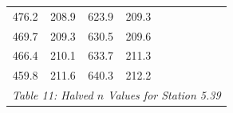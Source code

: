 \begin{center}
\begin{tabular}{|cccc||cccc||cc|}
    476.2    & 208.9                   & 623.9 & 209.3                        &          &                        &       &                              &          &                                    \\
    469.7    & 209.3                   & 630.5 & 209.6                        &          &                        &       &                              &          &                                    \\
    466.4    & 210.1                   & 633.7 & 211.3                        &          &                        &       &                              &          &                                    \\
    459.8    & 211.6                   & 640.3 & 212.2                        &          &                        &       &                              &          &                                    \\
    \hline\multicolumn{10}{c}{\emph{Table 11: Halved $n$ Values for Station 5.39}}
\end{tabular}


\end{center}
